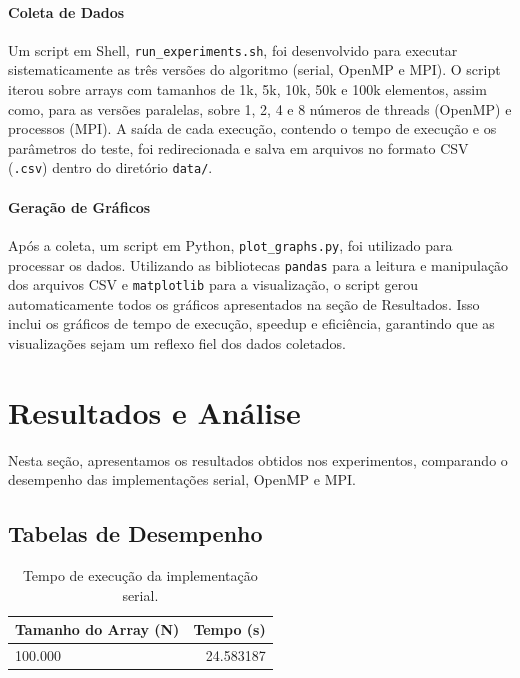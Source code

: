 \documentclass[12pt, a4paper]{article}
\begin{document}
\paragraph{Coleta de Dados}
Um script em Shell, \texttt{run\_experiments.sh}, foi desenvolvido para executar sistematicamente as três versões do algoritmo (serial, OpenMP e MPI). O script iterou sobre arrays com tamanhos de 1k, 5k, 10k, 50k e 100k elementos, assim como, para as versões paralelas, sobre 1, 2, 4 e 8 números de threads (OpenMP) e processos (MPI). A saída de cada execução, contendo o tempo de execução e os parâmetros do teste, foi redirecionada e salva em arquivos no formato CSV (\texttt{.csv}) dentro do diretório \texttt{data/}.

\paragraph{Geração de Gráficos}
Após a coleta, um script em Python, \texttt{plot\_graphs.py}, foi utilizado para processar os dados. Utilizando as bibliotecas \texttt{pandas} para a leitura e manipulação dos arquivos CSV e \texttt{matplotlib} para a visualização, o script gerou automaticamente todos os gráficos apresentados na seção de Resultados. Isso inclui os gráficos de tempo de execução, speedup e eficiência, garantindo que as visualizações sejam um reflexo fiel dos dados coletados.

\section{Resultados e Análise}
Nesta seção, apresentamos os resultados obtidos nos experimentos, comparando o desempenho das implementações serial, OpenMP e MPI.


\subsection{Tabelas de Desempenho}

\begin{table}[H]
\centering
\caption{Tempo de execução da implementação serial.}
\label{tab:serial}
\begin{tabular}{@{}lr@{}}
\toprule
\textbf{Tamanho do Array (N)} & \textbf{Tempo (s)} \\ \midrule
100.000                       & 24.583187          \\ \bottomrule
\end{tabular}
\end{table}
\end{document}
